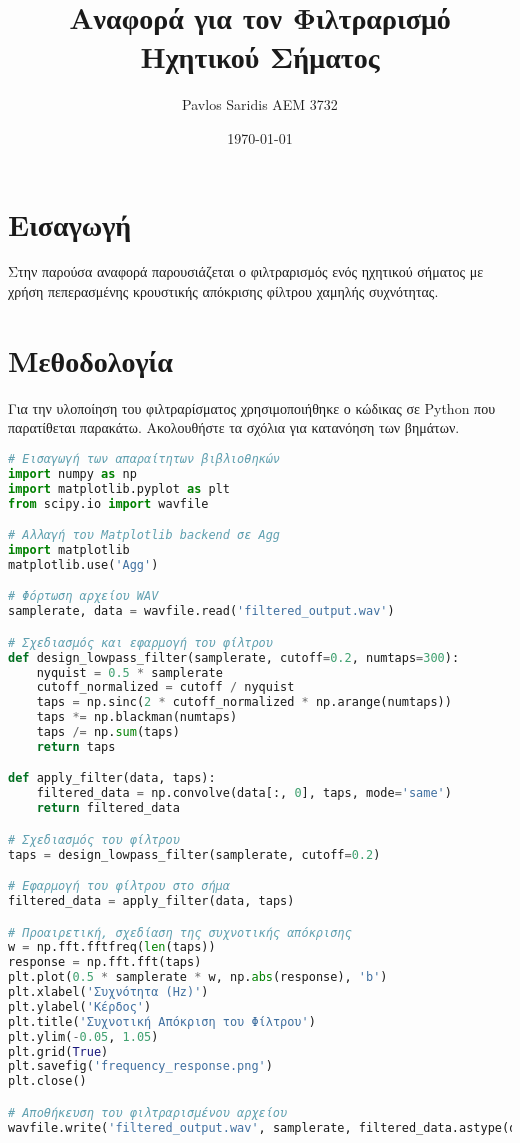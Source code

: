 \documentclass{article}
\title{Αναφορά για τον Φιλτραρισμό Ηχητικού Σήματος}
\author{Pavlos Saridis AEM 3732}
\date{\today}
\begin{document}
\maketitle

\section*{Εισαγωγή}
Στην παρούσα αναφορά παρουσιάζεται ο φιλτραρισμός ενός ηχητικού σήματος με χρήση πεπερασμένης κρουστικής απόκρισης φίλτρου χαμηλής συχνότητας.

\section*{Μεθοδολογία}

Για την υλοποίηση του φιλτραρίσματος χρησιμοποιήθηκε ο κώδικας σε Python που παρατίθεται παρακάτω. Ακολουθήστε τα σχόλια για κατανόηση των βημάτων.

\begin{lstlisting}[language=Python, caption=Κώδικας Python για τον φιλτραρισμό ηχητικού σήματος]
# Εισαγωγή των απαραίτητων βιβλιοθηκών
import numpy as np
import matplotlib.pyplot as plt
from scipy.io import wavfile

# Αλλαγή του Matplotlib backend σε Agg
import matplotlib
matplotlib.use('Agg')

# Φόρτωση αρχείου WAV
samplerate, data = wavfile.read('filtered_output.wav')

# Σχεδιασμός και εφαρμογή του φίλτρου
def design_lowpass_filter(samplerate, cutoff=0.2, numtaps=300):
    nyquist = 0.5 * samplerate
    cutoff_normalized = cutoff / nyquist
    taps = np.sinc(2 * cutoff_normalized * np.arange(numtaps))
    taps *= np.blackman(numtaps)
    taps /= np.sum(taps)
    return taps

def apply_filter(data, taps):
    filtered_data = np.convolve(data[:, 0], taps, mode='same')
    return filtered_data

# Σχεδιασμός του φίλτρου
taps = design_lowpass_filter(samplerate, cutoff=0.2)

# Εφαρμογή του φίλτρου στο σήμα
filtered_data = apply_filter(data, taps)

# Προαιρετική, σχεδίαση της συχνοτικής απόκρισης
w = np.fft.fftfreq(len(taps))
response = np.fft.fft(taps)
plt.plot(0.5 * samplerate * w, np.abs(response), 'b')
plt.xlabel('Συχνότητα (Hz)')
plt.ylabel('Κέρδος')
plt.title('Συχνοτική Απόκριση του Φίλτρου')
plt.ylim(-0.05, 1.05)
plt.grid(True)
plt.savefig('frequency_response.png')
plt.close()

# Αποθήκευση του φιλτραρισμένου αρχείου
wavfile.write('filtered_output.wav', samplerate, filtered_data.astype(data.dtype))
\end{lstlisting}
\end{document}
